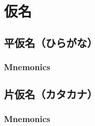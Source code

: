 \documentclass{article}
\begin{document}

\pagebreak

\section{仮名}
\subsection{平仮名（ひらがな）}
\subsubsection{Mnemonics}
\subsection{片仮名（カタカナ）}
\subsubsection{Mnemonics}
\end{document}
